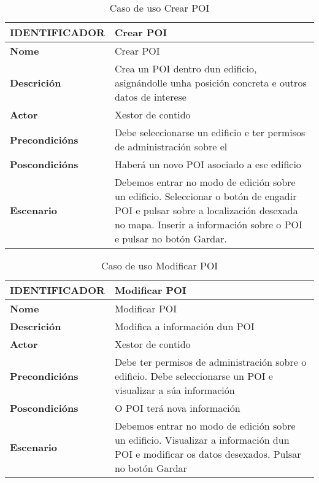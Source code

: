 \begin{table}[tbp]
	\begin{tabular}{|l|p{10cm}|}
		\hline 
		\textbf{IDENTIFICADOR}	& \textbf{Crear POI} \\ 
		\hline 
		\textbf{Nome} & Crear POI \\ 
		\hline 
		\textbf{Descrición} & Crea un POI dentro dun edificio, asignándolle unha posición concreta e outros datos de interese \\ 
		\hline 
		\textbf{Actor} & Xestor de contido \\ 
		\hline 
		\textbf{Precondicións} & Debe seleccionarse un edificio e ter permisos de administración sobre el \\ 
		\hline 
		\textbf{Poscondicións} & Haberá un novo POI asociado a ese edificio \\ 
		\hline 
		\textbf{Escenario} & Debemos entrar no modo de edición sobre un edificio. Seleccionar o botón de engadir POI e pulsar sobre a localización desexada no mapa. Inserir a información sobre o POI e pulsar no botón Gardar. \\ 
		\hline 
	\end{tabular}
	\caption{Caso de uso Crear POI}
	\label{tab:cuCrearPOI}
\end{table}

\begin{table}[tbp]
	\begin{tabular}{|l|p{10cm}|}
		\hline 
		\textbf{IDENTIFICADOR}	& \textbf{Modificar POI} \\ 
		\hline 
		\textbf{Nome} & Modificar POI \\ 
		\hline 
		\textbf{Descrición} & Modifica a información dun POI \\ 
		\hline 
		\textbf{Actor} & Xestor de contido \\ 
		\hline 
		\textbf{Precondicións} &  Debe ter permisos de administración sobre o edificio. Debe seleccionarse un POI e visualizar a súa información \\ 
		\hline 
		\textbf{Poscondicións} & O POI terá nova información \\ 
		\hline 
		\textbf{Escenario} & Debemos entrar no modo de edición sobre un edificio. Visualizar a información dun POI e modificar os datos desexados. Pulsar no botón Gardar \\ 
		\hline 
	\end{tabular}
	\caption{Caso de uso Modificar POI}
	\label{tab:cuModificarPOI}
\end{table}

